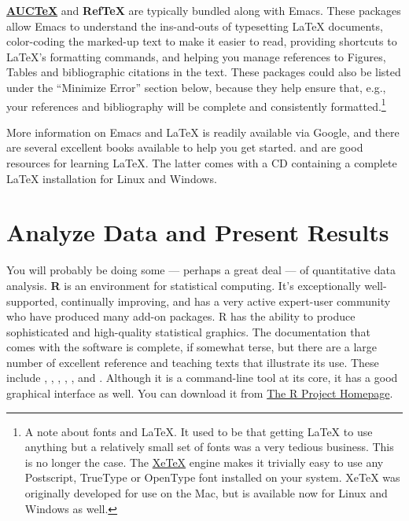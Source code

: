 \documentclass[11pt,article,oneside]{memoir}
\begin{document}
\textbf{\href{http://www.gnu.org/software/auctex/}{AUCTeX}} and \textbf{RefTeX} are typically bundled along with Emacs. These packages allow Emacs to understand the ins-and-outs of typesetting LaTeX documents, color-coding the marked-up text to make it easier to read, providing shortcuts to LaTeX's formatting commands, and helping you manage references to Figures, Tables and bibliographic citations in the text. These packages could also be listed under the ``Minimize Error'' section below, because they help ensure that, e.g., your references and bibliography will be complete and consistently formatted.\footnote{A note about fonts and LaTeX. It used to be that getting LaTeX to use anything but a relatively small set of fonts was a very tedious business. This is no longer the case. The \href{http://scripts.sil.org/cms/scripts/page.php?site_id=nrsi&id=xetex}{XeTeX} engine makes it trivially easy to use any Postscript, TrueType or OpenType font installed on your system. XeTeX was originally developed for use on the Mac, but is available now for Linux and Windows as well.} 

More information on Emacs and LaTeX is readily available via Google, and there are several excellent books available to help you get started. \citet{kopka03:_guide_latex} and \citet{mittlebach04:_latex_compan} are good resources for learning LaTeX. The latter comes with a CD containing a complete LaTeX installation for Linux and Windows. 
     
\section{Analyze Data and Present Results} 
You will probably be doing some --- perhaps a great deal --- of quantitative data analysis. \textbf{R} is an environment for statistical computing. It's exceptionally well-supported, continually improving, and has a very active expert-user community who have produced many add-on packages. R has the ability to produce sophisticated and high-quality statistical graphics. The documentation that comes with the software is complete, if somewhat terse, but there are a large number of excellent reference and teaching texts that illustrate its use. These include \citet{dalgaard02:_introd_statis_r}, \citet{venables02:_moder_applied_statis_s_plus}, \citet{maindonald03:_data_analy_graph_using_r}, \citet{fox02:_r_s_plus_compan_applied_regres}, \citet{frank01:_regres_model_strat}, and 
\citet{gelmanhill07:data_analysis}. Although it is a command-line tool at its core, it has a good graphical interface as well. You can download it from \href{http://www.r-project.org/}{The R Project Homepage}.     
\end{document}
